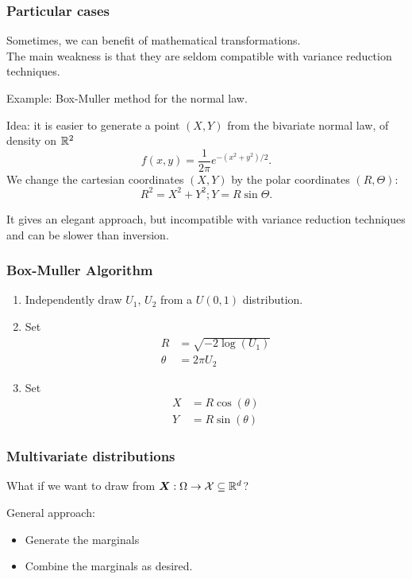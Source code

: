 \documentclass{beamer}
\begin{document}
	\begin{frame}
		\frametitle{Particular cases}
		
		Sometimes, we can benefit of mathematical transformations.\\
		The main weakness is that they are seldom compatible with variance
		reduction techniques.
		
		\mbox{}
		
		{\blue Example}: Box-Muller method for the normal law.
		
		\mbox{}
		
		{\red Idea}: it is easier to generate a point $(X, Y)$ from the bivariate
		normal law, of density on $\mathbb{R}^2$
		\[
		f (x, y ) = \frac{1}{2\pi} e^{-(x^2 +y^2 )/2}.
		\]
		We change the cartesian coordinates $(X,Y)$ by the polar coordinates $(R, \Theta)$:\\
		\[
		R^2 = X^2 + Y^2 ; Y = R \sin \Theta.
		\]
		
		It gives an elegant approach, but incompatible with variance reduction techniques and can be slower than inversion.
		
\end{frame}

\begin{frame}
\frametitle{Box-Muller Algorithm}

\begin{enumerate}
\item
Independently draw $U_1$, $U_2$ from a $U(0,1)$ distribution.
\item
Set
\begin{align*}
R &= \sqrt{-2 \log (U_1)} \\
\theta &= 2 \pi U_2
\end{align*}
\item
Set
\begin{align*}
X &= R \cos(\theta) \\
Y &= R \sin(\theta)
\end{align*}
\end{enumerate}
		
\end{frame}

\begin{frame}
\frametitle{Multivariate distributions}

What if we want to draw from ${\boldsymbol{X}}: \Omega \rightarrow {\mathcal{X}} \subseteq {\mathbb{R}}^d$?

General approach:
\begin{itemize}
	\item Generate the marginals
	\item Combine the marginals as desired.
\end{itemize}
		
\end{frame}
\end{document}
